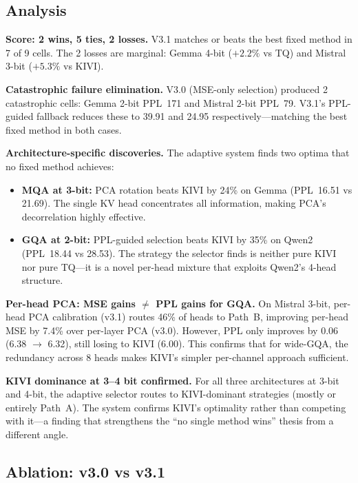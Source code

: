 \documentclass[10pt,twocolumn]{article}
\begin{document}
\subsection{Analysis}

\textbf{Score: 2 wins, 5 ties, 2 losses.} V3.1 matches or beats the
best fixed method in 7 of 9 cells. The 2 losses are marginal: Gemma
4-bit ($+2.2\%$ vs TQ) and Mistral 3-bit ($+5.3\%$ vs KIVI).

\textbf{Catastrophic failure elimination.} V3.0 (MSE-only selection)
produced 2 catastrophic cells: Gemma 2-bit PPL~171 and Mistral 2-bit
PPL~79. V3.1's PPL-guided fallback reduces these to 39.91 and 24.95
respectively---matching the best fixed method in both cases.

\textbf{Architecture-specific discoveries.} The adaptive system finds
two optima that no fixed method achieves:
\begin{itemize}[nosep]
\item \textbf{MQA at 3-bit:} PCA rotation beats KIVI by 24\% on Gemma
      (PPL~16.51 vs 21.69). The single KV head concentrates all
      information, making PCA's decorrelation highly effective.
\item \textbf{GQA at 2-bit:} PPL-guided selection beats KIVI by 35\%
      on Qwen2 (PPL~18.44 vs 28.53). The strategy the selector finds
      is neither pure KIVI nor pure TQ---it is a novel per-head mixture
      that exploits Qwen2's 4-head structure.
\end{itemize}

\textbf{Per-head PCA: MSE gains $\neq$ PPL gains for GQA.} On Mistral
3-bit, per-head PCA calibration (v3.1) routes 46\% of heads to Path~B,
improving per-head MSE by 7.4\% over per-layer PCA (v3.0). However,
PPL only improves by 0.06 (6.38 $\to$ 6.32), still losing to KIVI
(6.00). This confirms that for wide-GQA, the redundancy across 8 heads
makes KIVI's simpler per-channel approach sufficient.

\textbf{KIVI dominance at 3--4 bit confirmed.} For all three
architectures at 3-bit and 4-bit, the adaptive selector routes to
KIVI-dominant strategies (mostly or entirely Path~A). The system
confirms KIVI's optimality rather than competing with it---a finding
that strengthens the ``no single method wins'' thesis from a different
angle.

\subsection{Ablation: v3.0 vs v3.1}
\end{document}

